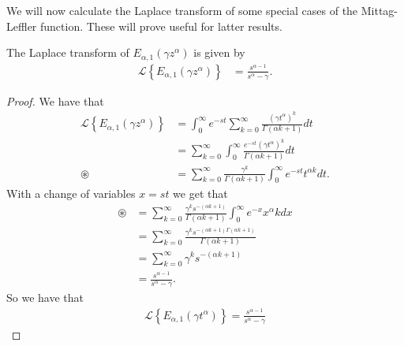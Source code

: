We will now calculate the Laplace transform of some special cases of the Mittag-Leffler function. These will prove useful for latter results. 
\begin{mdframed}[innertopmargin=10pt]
\begin{lemma}
    \label{lem:lap_mit}
    The Laplace transform of $ E_{\alpha, 1}(\gamma z^\alpha ) $ is given by
    \begin{align*}
        \mathcal{L} \left\{ E_{\alpha, 1}(\gamma z^\alpha ) \right\} &= \frac{s^{\alpha - 1}}{s^\alpha - \gamma}.
    \end{align*}
\end{lemma}
\end{mdframed}
\begin{proof}
    We have that
    \begin{align*}
        \mathcal{L}\left\{ E_{\alpha, 1}(\gamma z^\alpha)\right\} &= \int_0^\infty e^{-st} \sum_{k=0}^\infty \frac{(\gamma t^\alpha)^k}{\Gamma(\alpha k + 1)} dt \\
        &= \sum_{k=0}^\infty \int_0^\infty \frac{e^{-st} (\gamma t^\alpha)^k}{\Gamma(\alpha k + 1)} dt \\
        \circledast &= \sum_{k=0}^\infty \frac{\gamma^k}{\Gamma(\alpha k + 1)}\int_0^\infty e^{-st}t^{\alpha k} dt.
    \end{align*}
    With a change of variables $ x = st $ we get that
    \begin{align*}
        \circledast &= \sum_{k=0}^\infty \frac{\gamma^k s^{-(\alpha k+1)}}{\Gamma(\alpha k + 1)} \int_0^\infty e^{-x} x^\alpha kdx \\
        &= \sum_{k=0}^\infty \frac{\gamma^k s^{-(\alpha k + 1)\Gamma(\alpha k + 1)}}{\Gamma(\alpha k + 1)} \\
        &= \sum_{k=0}^\infty \gamma^k s^{-(\alpha k+1)} \\
        &= \frac{s^{\alpha - 1}}{s^\alpha - \gamma}.
    \end{align*}
    So we have that
    \begin{align*}
        \mathcal{L}\left\{ E_{\alpha,1}( \gamma t^\alpha ) \right\} = \frac{s^{\alpha - 1}}{s^\alpha - \gamma}
    \end{align*}
\end{proof}


